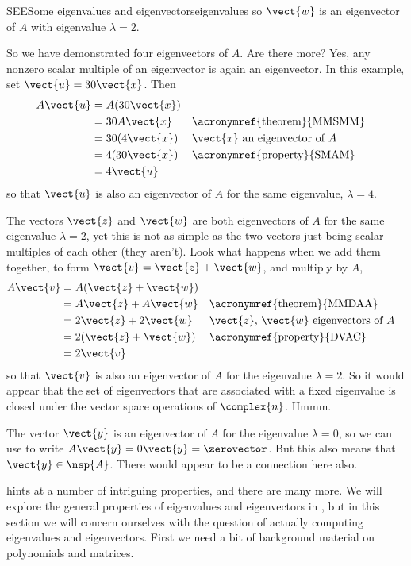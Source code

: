 \begin{example}{SEE}{Some eigenvalues and eigenvectors}{eigenvalues}
so $\vect{w}$ is an eigenvector of $A$ with eigenvalue $\lambda=2$.\par
%
So we have demonstrated four eigenvectors of $A$.  Are there more?  Yes, any nonzero scalar multiple of an eigenvector is again an eigenvector.  In this example, set $\vect{u}=30\vect{x}$.  Then
%
\begin{align*}
A\vect{u}
&=A(30\vect{x})\\
&=30A\vect{x}&&\text{\acronymref{theorem}{MMSMM}}\\
&=30(4\vect{x})&&\text{$\vect{x}$ an eigenvector of $A$}\\
&=4(30\vect{x})&&\text{\acronymref{property}{SMAM}}\\
&=4\vect{u}
\end{align*}
%
so that $\vect{u}$ is also an eigenvector of $A$ for the same eigenvalue, $\lambda=4$.\par
%
The vectors $\vect{z}$ and $\vect{w}$ are both eigenvectors of $A$ for the same eigenvalue $\lambda=2$, yet this is not as simple as the two vectors just being scalar multiples of each other (they aren't).  Look what happens when we add them together, to form $\vect{v}=\vect{z}+\vect{w}$, and multiply by $A$,
%
\begin{align*}
A\vect{v}
&=A(\vect{z}+\vect{w})\\
&=A\vect{z}+A\vect{w}&&\text{\acronymref{theorem}{MMDAA}}\\
&=2\vect{z}+2\vect{w}&&\text{$\vect{z}$, $\vect{w}$ eigenvectors of $A$}\\
&=2(\vect{z}+\vect{w})&&\text{\acronymref{property}{DVAC}}\\
&=2\vect{v}
\end{align*}
%
so that $\vect{v}$ is also an eigenvector of $A$ for the eigenvalue $\lambda=2$.  So it would appear that the set of eigenvectors that are associated with a fixed eigenvalue is closed under the vector space operations of $\complex{n}$.  Hmmm.\par
%
The vector $\vect{y}$ is an eigenvector of $A$ for the eigenvalue $\lambda=0$, so we can use  to write $A\vect{y}=0\vect{y}=\zerovector$.  But this also means that $\vect{y}\in\nsp{A}$.  There would appear to be a connection here also.
%
\end{example}
%
 hints at a number of intriguing properties, and there are many more.  We will explore the general properties of eigenvalues and eigenvectors in , but in this section we will concern ourselves with the question of actually computing eigenvalues and eigenvectors.  First we need a bit of background material on polynomials and matrices.
